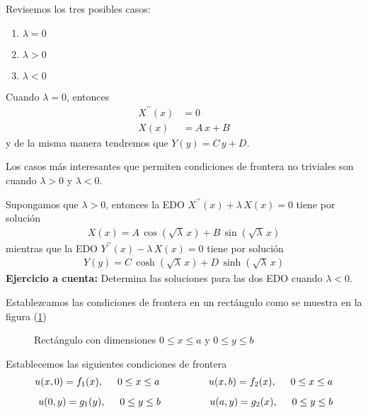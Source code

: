Revisemos los tres posibles casos:
\begin{enumerate}[label=\roman*)]
\item $\lambda = 0$
\item $\lambda > 0$
\item $\lambda < 0$
\end{enumerate}
Cuando $\lambda = 0$, entonces 
\begin{align*}
X^{\prime \prime}(x) &= 0 \\
X(x) &= A \, x + B
\end{align*}
y de la misma manera tendremos que $Y(y) = C \, y + D$.
\par
Los casos más interesantes que permiten condiciones de frontera no triviales son cuando $\lambda > 0$ y $\lambda < 0$.
\par
Supongamos que $\lambda > 0$, entonces la EDO $X^{\prime \prime} (x) + \lambda \, X(x) = 0 $ tiene por solución
\begin{align*}
X(x) = A \, \cos (\sqrt{\lambda} \, x) + B \, \sin (\sqrt{\lambda} \, x)
\end{align*}
mientras que la EDO $Y^{\prime \prime} (x) - \lambda \, X(x) = 0 $ tiene por solución
\begin{align*}
Y(y) = C \, \cosh (\sqrt{\lambda} \, x) + D \, \sinh (\sqrt{\lambda} \, x)
\end{align*}
\textbf{Ejercicio a cuenta: } Determina las soluciones para las dos EDO cuando $\lambda < 0$.
\par
Establezcamos las condiciones de frontera en un rectángulo como se muestra en la figura (\ref{fig:figura_ecalor_01})
\begin{figure}[H]
    \centering
    
    \caption{Rectángulo con dimensiones $0 \leq x \leq a$ y $0 \leq y \leq b$}
    \label{fig:figura_ecalor_01}
\end{figure}
Establecemos las siguientes condiciones de frontera
\begin{align*}
u(x, 0) = f_{1} (x), \hspace{0.5cm} 0 \leq x \leq a \hspace{1.75cm} u(x, b) = f_{2} (x), \hspace{0.5cm} 0 \leq x \leq a \\[0.5em]
u(0, y) = g_{1} (y), \hspace{0.5cm} 0 \leq y \leq b \hspace{1.75cm} u(a, y) = g_{2} (x), \hspace{0.5cm} 0 \leq y \leq b 
\end{align*}

